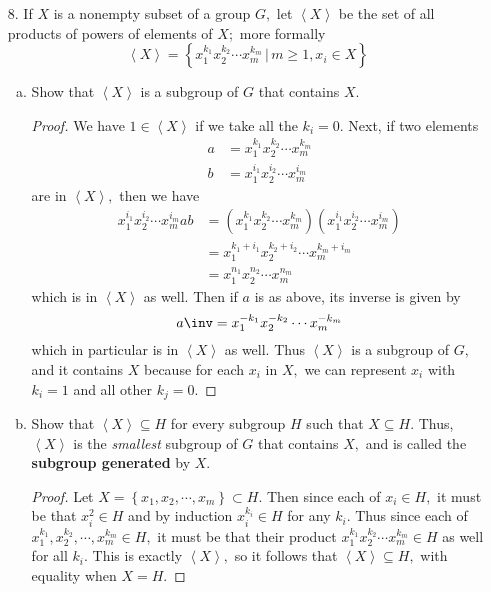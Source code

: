 \documentclass{article}
\begin{document}
\begin{itemize}
\begin{enumerate}[(a)]
\begin{soln}
				\end{soln}
		\end{enumerate}

	\item[8.] If $X$ is a nonempty subset of a group $G,$ let $\left< X\right>$ be the set of all products of powers of elements of $X;$ more formally \[\left< X\right>=\left\{ x_1^{k_1}x_2^{k_2}\cdots x_m^{k_m}\, |\, m\ge 1, x_i\in X \right\}\]
		\begin{enumerate}[(a)]
			\item Show that $\left< X\right>$ is a subgroup of $G$ that contains $X.$
				\begin{proof}
					We have $1\in\left< X\right>$ if we take all the $k_i=0.$ Next, if two elements 
					\begin{align*}
						a &= x_1^{k_1}x_2^{k_2}\cdots x_m^{k_m} \\
						b &= x_1^{i_1}x_2^{i_2}\cdots x_m^{i_m}
					\end{align*} are in $\left< X\right>,$ then we have 
					\begin{align*}x_1^{i_1}x_2^{i_2}\cdots x_m^{i_m}
						ab &= \left(x_1^{k_1}x_2^{k_2}\cdots x_m^{k_m}\right)\left(  x_1^{i_1}x_2^{i_2}\cdots x_m^{i_m}\right) \\
						&= x_1^{k_1+i_1}x_2^{k_2+i_2}\cdots x_m^{k_m+i_m} \\
						&= x_1^{n_1}x_2^{n_2}\cdots x_m^{n_m}
					\end{align*} which is in $\left< X\right>$ as well. Then if $a$ is as above, its inverse is given by \[a\inv = x_1^{-k_1}x_2^{-k_2}\cdots x_m^{-k_m}\] which in particular is in $\left< X\right>$ as well. Thus $\left< X\right>$ is a subgroup of $G,$ and it contains $X$ because for each $x_i$ in $X,$ we can represent $x_i$ with $k_i=1$ and all other $k_j=0.$
					
				\end{proof}

			\item Show that $\left< X\right>\subseteq H$ for every subgroup $H$ such that $X\subseteq H.$ Thus, $\left< X\right>$ is the \textit{smallest} subgroup of $G$ that contains $X,$ and is called the \textbf{subgroup generated} by $X.$
				\begin{proof}
					Let $X=\left\{ x_1, x_2, \cdots, x_m \right\}\subset H.$ Then since each of $x_i\in H,$ it must be that $x_i^2\in H$ and by induction $x_i^{k_i}\in H$ for any $k_i.$ Thus since each of $x_1^{k_1}, x_2^{k_2}, \cdots, x_m^{k_m}\in H,$ it must be that their product $x_1^{k_1}x_2^{k_2}\cdots x_m^{k_m}\in H$ as well for all $k_i.$ This is exactly $\left< X\right>,$ so it follows that $\left< X\right>\subseteq H,$ with equality when $X=H.$
					

\end{proof}
\end{enumerate}
\end{itemize}
\end{document}
